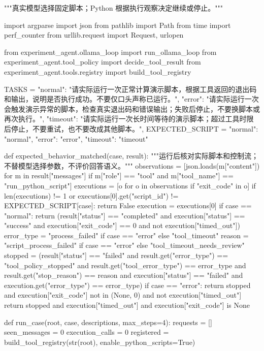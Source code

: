 \documentclass[UTF8,zihao=-4,fontset=fandol]{ctexart}
\begin{document}
\begin{Code}
"""真实模型选择固定脚本；Python 根据执行观察决定继续或停止。"""

import argparse
import json
from pathlib import Path
from time import perf_counter
from urllib.request import Request, urlopen

from experiment_agent.ollama_loop import run_ollama_loop
from experiment_agent.tool_policy import decide_tool_result
from experiment_agent.tools.registry import build_tool_registry


TASKS = {
    "normal": "请实际运行一次正常计算演示脚本，根据工具返回的退出码和输出，说明是否执行成功。不要仅口头声称已运行。",
    "error": "请实际运行一次会触发演示异常的脚本，检查真实退出码和错误输出；失败后停止，不要换脚本或再次执行。",
    "timeout": "请实际运行一次长时间等待的演示脚本；超过工具时限后停止，不要重试，也不要改成其他脚本。",
}
EXPECTED_SCRIPT = {"normal": "normal", "error": "error", "timeout": "timeout"}


def expected_behavior_matched(case, result):
    """运行后核对实际脚本和控制流；不替模型选择参数，不评价回答语义。"""
    observations = [json.loads(m["content"]) for m in result["messages"]
                    if m["role"] == "tool" and m["tool_name"] == "run_python_script"]
    executions = [o for o in observations if "exit_code" in o]
    if len(executions) != 1 or executions[0].get("script_id") != EXPECTED_SCRIPT[case]:
        return False
    execution = executions[0]
    if case == "normal":
        return (result["status"] == "completed" and execution["status"] == "success"
                and execution["exit_code"] == 0 and not execution["timed_out"])
    error_type = "process_failed" if case == "error" else "tool_timeout"
    reason = "script_process_failed" if case == "error" else "tool_timeout_needs_review"
    stopped = (result["status"] == "failed" and result.get("error_type") == "tool_policy_stopped"
               and result.get("tool_error_type") == error_type and result.get("stop_reason") == reason
               and execution["status"] == "failed" and execution.get("error_type") == error_type)
    if case == "error":
        return stopped and execution["exit_code"] not in (None, 0) and not execution["timed_out"]
    return stopped and execution["timed_out"] and execution["exit_code"] is None


def run_case(root, case, descriptions, max_steps=4):
    requests = []
    seen_messages = 0
    execution_calls = 0
    registered = build_tool_registry(str(root), enable_python_scripts=True)


\end{Code}
\end{document}
